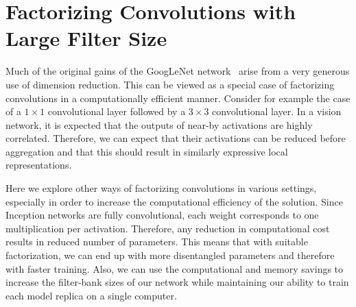 \section{Factorizing Convolutions with Large Filter Size}

Much of the original gains of the  GoogLeNet network~\cite{szegedy2015going}
arise from a very generous use of dimension reduction. This can be viewed
as a special case of factorizing convolutions in a computationally efficient
manner. Consider for example the case of a $1\times 1$ convolutional layer
followed by a $3\times 3$ convolutional layer.
In a vision network, it is expected that the outputs
of near-by activations are highly correlated. Therefore,
we can expect that their activations can be reduced before
aggregation and that this should result in
similarly expressive local representations.

Here we explore other
ways of factorizing convolutions in various settings, especially in order to
increase the computational efficiency of the solution. Since Inception networks
are fully convolutional, each weight corresponds to one multiplication per
activation. Therefore, any reduction in computational cost results in reduced
number of parameters. This means that with suitable factorization, we can end up
with more disentangled parameters and therefore with faster training.
Also, we can use the computational and memory savings to increase the
filter-bank sizes of our network while maintaining our ability to train
each model replica on a single computer.

